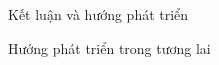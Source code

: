 \begin{frame}{Kết luận và hướng phát triển}
    

\end{frame}

\begin{frame}{Hướng phát triển trong tương lai}
    
\end{frame}

